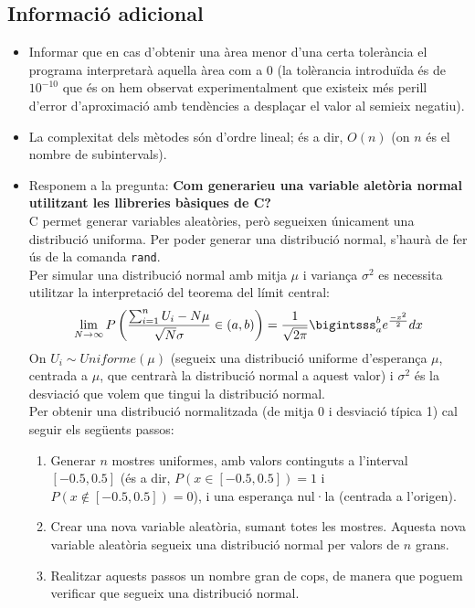 \documentclass[12pt]{article}
\begin{document}
\subsection{Informació adicional}
\begin{itemize}
    \item Informar que en cas d'obtenir una àrea menor d'una certa tolerància el programa interpretarà aquella àrea com a 0 (la tolèrancia introduïda és de $10^{-10}$ que és on hem observat experimentalment que existeix més perill d'error d'aproximació amb tendències a desplaçar el valor al semieix negatiu).

    \item La complexitat dels mètodes són d'ordre lineal; és a dir, $O(n)$ (on $n$ és el nombre de subintervals).

    \item Responem a la pregunta: \textbf{Com generarieu una variable
aletòria normal utilitzant les llibreries bàsiques de C?}\\
C permet generar variables aleatòries, però segueixen únicament una distribució uniforma. Per poder generar una distribució normal, s'haurà de fer ús de la comanda \texttt{rand}.\\
Per simular una distribució normal amb mitja $\mu$ i variança $\sigma^2$ es necessita utilitzar la interpretació del teorema del límit central: 
\begin{equation*}
    \lim_{N \to \infty} P\left(\frac{\sum_{i=1}^{n} U_{i} - N\mu }{\sqrt{N}\sigma} \in (a,b) \right) = \frac{1}{\sqrt{2\pi}} \bigintsss_{a}^{b} e^{\frac{-x^2}{2}} dx
\end{equation*}
On $U_i\sim Uniforme(\mu)$ (segueix una distribució uniforme d'esperança $\mu$, centrada a $\mu$, que centrarà la distribució normal a aquest valor) i $\sigma^2$ és la desviació que volem que tingui la distribució normal.\\
Per obtenir una distribució normalitzada (de mitja 0 i desviació típica 1) cal seguir els següents passos:
\begin{enumerate}
    \item Generar $n$ mostres uniformes, amb valors continguts a l'interval $[-0.5,0.5]$ (és a dir, $P(x\in[-0.5,0.5])=1$ i $P(x\not\in[-0.5,0.5])=0$), i una esperança nul·la (centrada a l'origen).
    \item Crear una nova variable aleatòria, sumant totes les mostres. Aquesta nova variable aleatòria segueix una distribució normal per valors de $n$ grans.
    \item Realitzar aquests passos un nombre gran de cops, de manera que poguem verificar que segueix una distribució normal. 
\end{enumerate}
\end{itemize}
\end{document}
